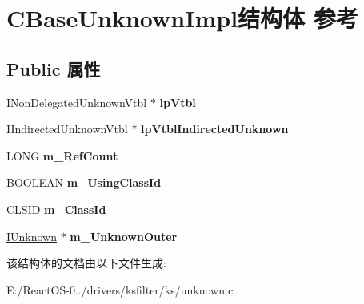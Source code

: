 \hypertarget{struct_c_base_unknown_impl}{}\section{C\+Base\+Unknown\+Impl结构体 参考}
\label{struct_c_base_unknown_impl}
\subsection*{Public 属性}
\begin{DoxyCompactItemize}
\item 
\mbox{\label{struct_c_base_unknown_impl_a3a4cf26e25196ed981b46bc9f55ad198}} 
I\+Non\+Delegated\+Unknown\+Vtbl $\ast$ {\bfseries lp\+Vtbl}
\item 
\mbox{\label{struct_c_base_unknown_impl_ac43e79fad0162516b430b7c523df56c1}} 
I\+Indirected\+Unknown\+Vtbl $\ast$ {\bfseries lp\+Vtbl\+Indirected\+Unknown}
\item 
\mbox{\label{struct_c_base_unknown_impl_a3b9b820c19690995206e47668ccbcdd8}} 
L\+O\+NG {\bfseries m\+\_\+\+Ref\+Count}
\item 
\mbox{\label{struct_c_base_unknown_impl_a5ce62b95d4f9bdc3b9ecc53cfd8fd27b}} 
\hyperlink{_processor_bind_8h_a112e3146cb38b6ee95e64d85842e380a}{B\+O\+O\+L\+E\+AN} {\bfseries m\+\_\+\+Using\+Class\+Id}
\item 
\mbox{\label{struct_c_base_unknown_impl_aca05407151dd464288924e90e6b9641e}} 
\hyperlink{struct___i_i_d}{C\+L\+S\+ID} {\bfseries m\+\_\+\+Class\+Id}
\item 
\mbox{\label{struct_c_base_unknown_impl_abe58b2677a3a14c710a01cf112118372}} 
\hyperlink{interface_i_unknown}{I\+Unknown} $\ast$ {\bfseries m\+\_\+\+Unknown\+Outer}
\end{DoxyCompactItemize}


该结构体的文档由以下文件生成\+:\begin{DoxyCompactItemize}
\item 
E\+:/\+React\+O\+S-\/0../drivers/ksfilter/ks/unknown.\+c\end{DoxyCompactItemize}

